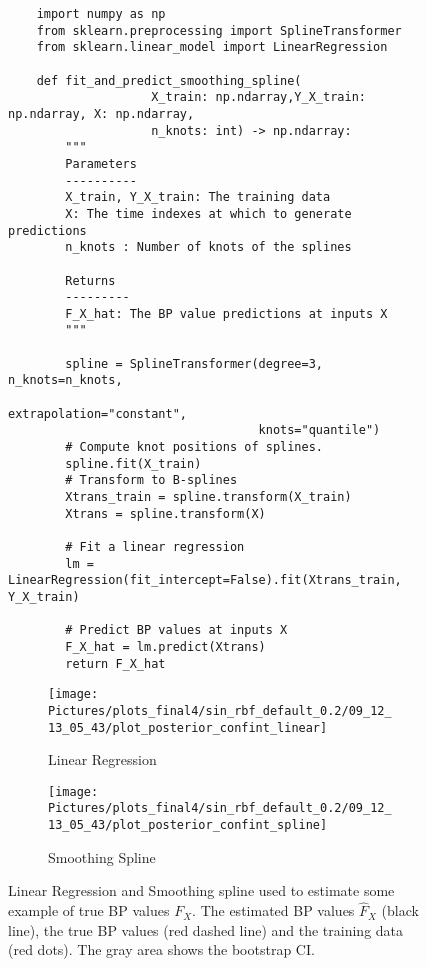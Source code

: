%
\begin{figure}[!htb]
\centering

\begin{verbatim}
    import numpy as np
    from sklearn.preprocessing import SplineTransformer
    from sklearn.linear_model import LinearRegression

    def fit_and_predict_smoothing_spline(
                    X_train: np.ndarray,Y_X_train: np.ndarray, X: np.ndarray,
                    n_knots: int) -> np.ndarray:
        """
        Parameters
        ----------
        X_train, Y_X_train: The training data
        X: The time indexes at which to generate predictions
        n_knots : Number of knots of the splines

        Returns
        ---------
        F_X_hat: The BP value predictions at inputs X
        """

        spline = SplineTransformer(degree=3, n_knots=n_knots,
                                   extrapolation="constant",
                                   knots="quantile")
        # Compute knot positions of splines.
        spline.fit(X_train)
        # Transform to B-splines
        Xtrans_train = spline.transform(X_train)
        Xtrans = spline.transform(X)

        # Fit a linear regression
        lm = LinearRegression(fit_intercept=False).fit(Xtrans_train, Y_X_train)

        # Predict BP values at inputs X
        F_X_hat = lm.predict(Xtrans)
        return F_X_hat

\end{verbatim}
\end{figure} \label{code:smoothing-spline}



\begin{figure}[!htb]
\centering
\begin{subfigure}{.5\textwidth}
    \centering
    \texttt{[image: 
        Pictures/plots\_final4/sin\_rbf\_default\_0.2/09\_12\_13\_05\_43/plot\_posterior\_confint\_linear]}
    \caption{Linear Regression}
    \label{fig:post-linear}
\end{subfigure}\hfill
\begin{subfigure}{.5\textwidth}
    \centering
    \texttt{[image: 
        Pictures/plots\_final4/sin\_rbf\_default\_0.2/09\_12\_13\_05\_43/plot\_posterior\_confint\_spline]}
    \caption{Smoothing Spline}
    \label{fig:post-spline}
\end{subfigure}
\caption{Linear Regression and Smoothing spline used
to estimate some example of true BP values $F_X$. The estimated BP values $\hat{F}_X$ (black line), the
        true BP values (red dashed line) and the training data (red dots). The gray area shows
the bootstrap CI.}
\label{fig:regression-example}
\end{figure}


